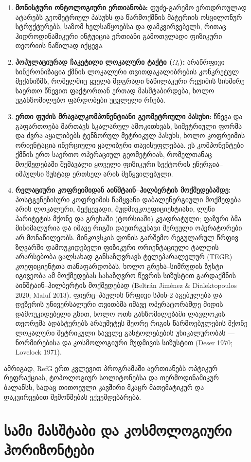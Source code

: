\documentclass[11pt,a4paper]{article}
\begin{document}
\begin{enumerate}[label=\arabic*.]
\item \textbf{მონისტური ონტოლოგიური ერთიანობა:} ფუძე-გარემო ერთდროულად ატარებს გეომეტრიულ პასუხს და წარმოქმნის მატერიის ოსცილონურ სტრუქტურებს, საზომ ხელსაწყოებსა და დამკვირვებელს, რითაც ჰიდროდინამიკური ინტუიცია ერთიანი გამოთვლადი ფიზიკური თეორიის ნაწილად იქცევა.
\item \textbf{პოპულაციურად ჩაკეტილი ლოკალური ტაქტი ($\Omega_t$):} არაწრფივი სინქრონიზაცია ქმნის ლოკალური თვითდაკალიბრების კონკრეტულ მექანიზმს, რომელშიც ყველა მდგრადი ნაწილაკური რეჟიმის სიხშირე საერთო წნევით ფაქტორთან ერთად მასშტაბირდება, ხოლო უგანზომილებო ფარდობები უცვლელი რჩება.
\item \textbf{ერთი ფუძის მრავალკომპონენტიანი გეომეტრიული პასუხი:} წნევა და გაფართოება მართავს სკალარულ ამოკითხვას, სიმეტრიული ფორმა და ძვრა აყალიბებს ტენზორულ მეტრიკულ პასუხს, ხოლო კოფრეიმის ორიენტაცია ინერციული ყალიბური თავისუფლებაა. ეს კომპონენტები ქმნის ერთ საერთო ოპერაციულ გეომეტრიას, რომელთანაც მოქმედებაში შემავალი ყოველი ფიზიკური სექტორის ენერგია–იმპულსი ზუსტად ერთხელ არის შეწყვილებული.
\item \textbf{რელაციური კოფრეიმიდან აინშტაინ–ჰილბერტის მოქმედებამდე:} პოსტგენეზისური კოფრეიმის წამყვანი დაბალენერგიული მოქმედება არის ლოკალური, შექცევადი, მუდმივკოეფიციენტიანი, ლუწი პარიტეტის მქონე და გრეხაში (ტორსიაში) კვადრატული; ფაზური ბმა მინიმალურია და იმავე რიგში დაუთრგუნავი შერეული ოპერატორები არ მონაწილეობს. მინკოვსკის ფონის გარშემო რეგულარულ წრფივ ზღვარში დამოუკიდებელი ფიზიკური ორიენტაციული ტალღის არარსებობა ცალსახად განსაზღვრავს ტელეპარალელურ (TEGR) კოეფიციენტთა თანაფარდობას, ხოლო გრეხა–სიმრუდის ზუსტი იგივეობა ამ მოქმედებას სასაზღვრო წევრის სიზუსტით გარდაქმნის აინშტაინ–ჰილბერტის მოქმედებად (Beltrán Jiménez \& Dialektopoulos 2020; Maluf 2013). ფიერც–პაულის წრფივი სპინ-2 აგებულება და დეზერის უნივერსალური თვითბმა იმავე ოპერატორამდე მიდის დამოუკიდებელი გზით, ხოლო ოთხ განზომილებაში ლავლოკის თეორემა ადასტურებს არაუმეტეს მეორე რიგის წარმოებულების მქონე ლოკალური მეტრიკული საველე განტოლებების უნიკალურობას — ნორმირებისა და კოსმოლოგიური მუდმივის სიზუსტით (Deser 1970; Lovelock 1971).

\end{enumerate}
ამრიგად, RefG ერთ კვლევით პროგრამაში აერთიანებს ოპტიკურ რეფრაქციას, ტოპოლოგიურ სოლიტონებსა და თერმოდინამიკურ ბალანსს, სადაც თითოეული კავშირი მკაცრ მათემატიკურ და დაკვირვებით შემოწმებას ექვემდებარება.


\section{სამი მასშტაბი და კოსმოლოგიური ჰორიზონტები}
\end{document}
